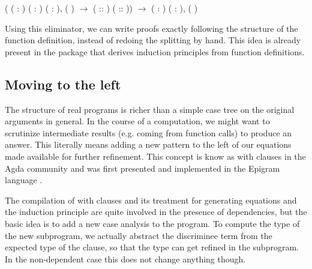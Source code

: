 \coqdocindent{1.50em}
(\coqdockw{\ensuremath{\forall}} ( : ) ( : ) (  :  ),\coqdoceol
\coqdocindent{1.50em}
    (  ) \ensuremath{\rightarrow}   ( :: )  ( ::   )) \ensuremath{\rightarrow}\coqdoceol
\coqdocindent{1.50em}
\coqdockw{\ensuremath{\forall}} ( : ) (  :  ),     (  ) 

\coqdocemptyline
  Using this eliminator, we can write proofs exactly following the 
  structure of the function definition, instead of redoing the splitting 
  by hand. This idea is already present in the  package 
  \cite{Barthe:2006gp} that derives induction principles from
  function definitions.
 \begin{coqdoccode}
\coqdocemptyline
\coqdocemptyline
\end{coqdoccode}
\subsection{Moving to the left}




   The structure of real programs is richer than a simple case tree on
   the original arguments in general. In the course of a computation, we
   might want to scrutinize intermediate results (e.g. coming from
   function calls) to produce an answer. This literally means adding a
   new pattern to the left of our equations made available for further
   refinement. This concept is know as with clauses in the Agda
   \cite{norell:thesis} community and was first presented and
   implemented in the Epigram language
   \cite{DBLP:journals/jfp/McBrideM04}.


   The compilation of with clauses and its treatment for generating
   equations and the induction principle are quite involved in the
   presence of dependencies, but the basic idea is to add a new case
   analysis to the program. To compute the type of the new subprogram,
   we actually abstract the discriminee term from the expected type of
   the clause, so that the type can get refined in the subprogram. In
   the non-dependent case this does not change anything though.


